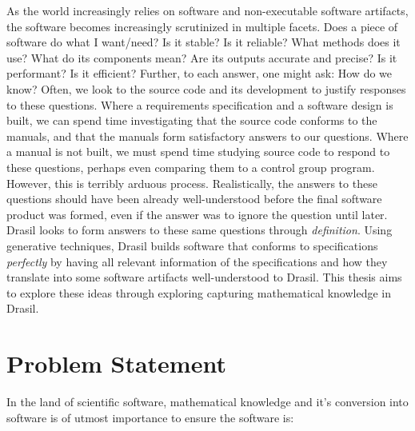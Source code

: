 As the world increasingly relies on software and non-executable software
artifacts, the software becomes increasingly scrutinized in multiple facets.
Does a piece of software do what I want/need? Is it stable? Is it reliable? What
methods does it use? What do its components mean? Are its outputs accurate and
precise? Is it performant? Is it efficient? Further, to each answer, one might
ask: How do we know? Often, we look to the source code and its development to
justify responses to these questions. Where a requirements specification and a
software design is built, we can spend time investigating that the source code
conforms to the manuals, and that the manuals form satisfactory answers to our
questions. Where a manual is not built, we must spend time studying source code
to respond to these questions, perhaps even comparing them to a control group
program. However, this is terribly arduous process. Realistically, the answers
to these questions should have been already well-understood before the final
software product was formed, even if the answer was to ignore the question until
later. Drasil \cite{Drasil2021} looks to form answers to these same questions
through \textit{definition}. Using generative techniques, Drasil builds software
that conforms to specifications \textit{perfectly} by having all relevant
information of the specifications and how they translate into some software
artifacts well-understood to Drasil. This thesis aims to explore these ideas
through exploring capturing mathematical knowledge in Drasil.

\section{Problem Statement}
\label{sec:intro:problemStatement}

In the land of scientific software, mathematical knowledge and it's conversion
into software is of utmost importance to ensure the software is:

